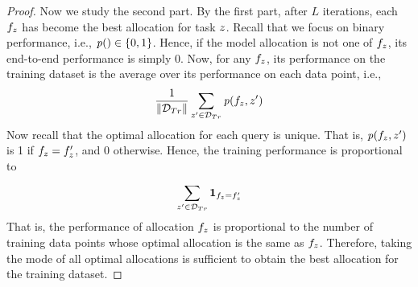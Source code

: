 \begin{proof}
Now we study the second part. By the first part, after $L$ iterations, each $f_z$ has become the best allocation for task $z$. Recall that we focus on binary performance, i.e., $\mathit{p}()\in \{0,1\}$.  Hence, if the model allocation is not one of $f_z$, its end-to-end performance is simply 0. Now, for any $f_z$, its performance on the training dataset is the average over its performance on each data point, i.e.,
\begin{equation*}
 \frac{1}{\|\mathcal{D}_{Tr}\|}\sum_{z' \in \mathcal{D}_{Tr} }^{} \mathit{p}(f_z, z')
\end{equation*}
Now recall that the optimal allocation for each query is unique. That is, $\mathit{p}(f_z, z')$ is 1 if $f_z=f_z'$, and 0 otherwise. Hence, the training performance is proportional to 
\begin{equation*}
 \sum_{z' \in \mathcal{D}_{Tr} }^{} \mathbf{1}_{f_z=f_z'}
\end{equation*}
That is, the performance of allocation $f_z$ is proportional to the number of training data points whose optimal allocation is the same as $f_z$. Therefore, taking the mode of all optimal allocations is sufficient to obtain the best allocation for the training dataset.
\end{proof}